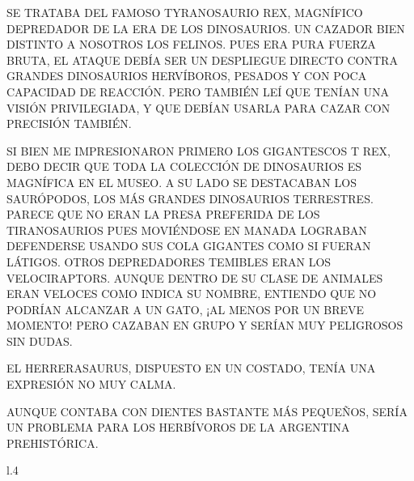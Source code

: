 SE TRATABA DEL FAMOSO TYRANOSAURIO REX, MAGNÍFICO DEPREDADOR DE LA ERA DE LOS DINOSAURIOS. UN CAZADOR BIEN DISTINTO A NOSOTROS LOS FELINOS. PUES ERA PURA FUERZA BRUTA, EL ATAQUE DEBÍA SER UN DESPLIEGUE DIRECTO CONTRA GRANDES DINOSAURIOS HERVÍBOROS, PESADOS Y CON POCA CAPACIDAD DE REACCIÓN. PERO TAMBIÉN LEÍ QUE TENÍAN UNA VISIÓN PRIVILEGIADA, Y QUE DEBÍAN USARLA PARA CAZAR CON PRECISIÓN TAMBIÉN.

\newpage
{}

SI BIEN ME IMPRESIONARON PRIMERO LOS GIGANTESCOS T REX, DEBO DECIR QUE TODA LA COLECCIÓN DE DINOSAURIOS ES MAGNÍFICA EN EL MUSEO. A SU LADO SE DESTACABAN LOS SAURÓPODOS, LOS MÁS GRANDES DINOSAURIOS TERRESTRES. PARECE QUE NO ERAN LA PRESA PREFERIDA DE LOS TIRANOSAURIOS PUES MOVIÉNDOSE EN MANADA LOGRABAN DEFENDERSE USANDO SUS COLA GIGANTES COMO SI FUERAN LÁTIGOS. OTROS DEPREDADORES TEMIBLES ERAN LOS  VELOCIRAPTORS. AUNQUE DENTRO DE SU CLASE DE ANIMALES ERAN VELOCES COMO INDICA SU NOMBRE, ENTIENDO QUE NO PODRÍAN ALCANZAR A UN GATO, ¡AL MENOS POR UN BREVE MOMENTO! PERO CAZABAN EN GRUPO Y SERÍAN MUY PELIGROSOS SIN DUDAS.

EL HERRERASAURUS, DISPUESTO EN UN COSTADO, TENÍA UNA EXPRESIÓN NO MUY CALMA. 

\newpage
{}



AUNQUE CONTABA CON DIENTES BASTANTE MÁS PEQUEÑOS, SERÍA UN PROBLEMA PARA LOS HERBÍVOROS DE LA ARGENTINA PREHISTÓRICA. 

\begin{wrapfigure} [7]{l}{.4\textwidth} 
\end{wrapfigure}

